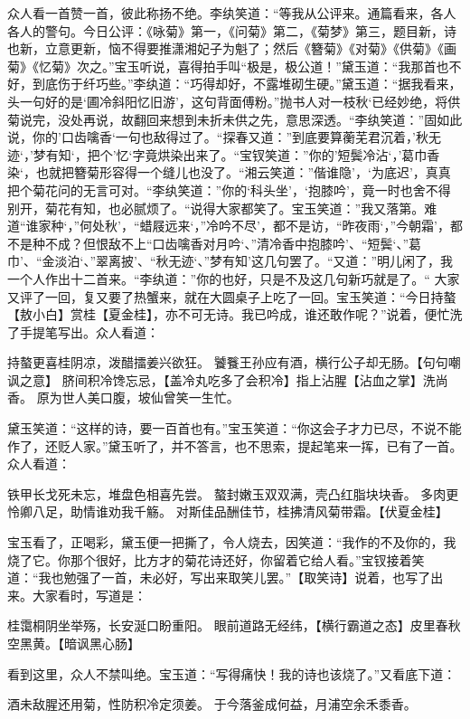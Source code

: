 \documentclass[12pt,oneside]{book}
\begin{document}
众人看一首赞一首，彼此称扬不绝。李纨笑道：“等我从公评来。通篇看来，各人各人的警句。今日公评：《咏菊》第一，《问菊》第二，《菊梦》第三，题目新，诗也新，立意更新，恼不得要推潇湘妃子为魁了；然后《簪菊》《对菊》《供菊》《画菊》《忆菊》次之。”宝玉听说，喜得拍手叫“极是，极公道！”黛玉道：“我那首也不好，到底伤于纤巧些。”李纨道：“巧得却好，不露堆砌生硬。”黛玉道：“据我看来，头一句好的是‘圃冷斜阳忆旧游’，这句背面傅粉。”抛书人对一枝秋‘已经妙绝，将供菊说完，没处再说，故翻回来想到未折未供之先，意思深透。“李纨笑道：”固如此说，你的’口齿噙香‘一句也敌得过了。“探春又道：”到底要算蘅芜君沉着，’秋无迹‘，’梦有知‘，把个’忆‘字竟烘染出来了。“宝钗笑道：”你的’短鬓冷沾‘，’葛巾香染‘，也就把簪菊形容得一个缝儿也没了。“湘云笑道：”偕谁隐’，‘为底迟’，真真把个菊花问的无言可对。“李纨笑道：”你的‘科头坐’，‘抱膝吟’，竟一时也舍不得别开，菊花有知，也必腻烦了。“说得大家都笑了。宝玉笑道：”我又落第。难道“谁家种‘，”何处秋’，“蜡屐远来‘，”冷吟不尽’，都不是访，“昨夜雨‘，”今朝霜’，都不是种不成？但恨敌不上“口齿噙香对月吟‘、”清冷香中抱膝吟’、“短鬓‘、”葛巾’、“金淡泊‘、”翠离披’、“秋无迹‘、”梦有知’这几句罢了。“又道：”明儿闲了，我一个人作出十二首来。“李纨道：”你的也好，只是不及这几句新巧就是了。“
大家又评了一回，复又要了热蟹来，就在大圆桌子上吃了一回。宝玉笑道：“今日持螯【敖小白】赏桂【夏金桂】，亦不可无诗。我已吟成，谁还敢作呢？”说着，便忙洗了手提笔写出。众人看道：

持螯更喜桂阴凉，泼醋擂姜兴欲狂。
饕餮王孙应有酒，横行公子却无肠。【句句嘲讽之意】
脐间积冷馋忘忌，【盖冷丸吃多了会积冷】指上沾腥【沾血之掌】洗尚香。
原为世人美口腹，坡仙曾笑一生忙。

黛玉笑道：“这样的诗，要一百首也有。”宝玉笑道：“你这会子才力已尽，不说不能作了，还贬人家。”黛玉听了，并不答言，也不思索，提起笔来一挥，已有了一首。众人看道：

铁甲长戈死未忘，堆盘色相喜先尝。
螯封嫩玉双双满，壳凸红脂块块香。
多肉更怜卿八足，助情谁劝我千觞。
对斯佳品酬佳节，桂拂清风菊带霜。【伏夏金桂】

宝玉看了，正喝彩，黛玉便一把撕了，令人烧去，因笑道：“我作的不及你的，我烧了它。你那个很好，比方才的菊花诗还好，你留着它给人看。”宝钗接着笑道：“我也勉强了一首，未必好，写出来取笑儿罢。”【取笑诗】说着，也写了出来。大家看时，写道是：

桂霭桐阴坐举殇，长安涎口盼重阳。
眼前道路无经纬，【横行霸道之态】皮里春秋空黑黄。【暗讽黑心肠】

看到这里，众人不禁叫绝。宝玉道：“写得痛快！我的诗也该烧了。”又看底下道：

酒未敌腥还用菊，性防积冷定须姜。
于今落釜成何益，月浦空余禾黍香。
\end{document}
